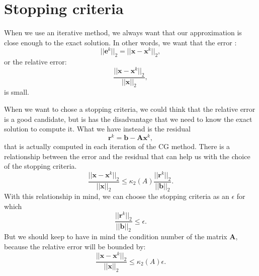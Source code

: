\documentclass[12pt]{article}
\begin{document}
{\newpage
\section{Stopping criteria}\label{a2}
\hspace{0.5cm}When we use an iterative method, we always want that our approximation is close enough 
to the exact solution. In other words, we want that the error \cite[pag. 42]{Saad03}: 
$$||\mathbf{e}^k||_2=||\mathbf{x}-\mathbf{x}^k||_2,$$ or the relative error: 
$$\frac{||\mathbf{x}-\mathbf{x}^k||_2}{||\mathbf{x}||_2},$$is small. \par
When we want to chose a stopping criteria, we could think that the relative error is a
good candidate, but is has the disadvantage that we need to know the exact solution to compute it.
What we have instead is the residual $$\mathbf{r}^k=\mathbf{b}-\mathbf{A}\mathbf{x}^k,$$ 
that is actually computed in each iteration of the CG method. There is a relationship between the 
error and the residual that can help us with the choice of the stopping criteria.
$$\frac{||\mathbf{x}-\mathbf{x}^k||_2}{||\mathbf{x}||_2}\leq \kappa_2(A)\frac{||\mathbf{r}^k||_2}{||\mathbf{b}||_2}.$$
With this relationship in mind, we can choose the stopping criteria as an $\epsilon$ for which
$$ \frac{||\mathbf{r}^k||_2}{||\mathbf{b}||_2}\leq \epsilon.$$
But we should keep to have in mind the condition number of the matrix $\mathbf{A}$, because the relative error will be bounded by:
$$\frac{||\mathbf{x}-\mathbf{x}^k||_2}{||\mathbf{x}||_2}\leq \kappa_2(A) \epsilon.$$
\newpage
}
\end{document}
